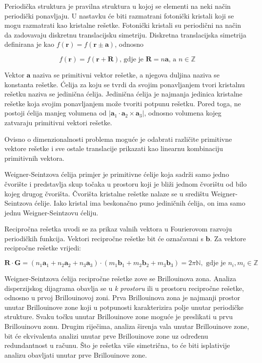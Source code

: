 \documentclass[utf8, seminar]{fer}
\begin{document}
Periodička struktura je pravilna struktura u kojoj se elementi na neki način
periodički ponavljaju. U nastavku će biti razmatrani fotonički kristali koji se
mogu razmatrati kao kristalne rešetke. Fotonički kristali su periodični na način
da zadovavaju diskretnu translacijsku simetriju.
Diskretna translacijska simetrija definirana je kao
${f(\mathbf{r}) = f(\mathbf{r} \pm \mathbf{a})}$, odnosno

\begin{equation}
	f(\mathbf{r}) = f(\mathbf{r} + \mathbf{R}) \text{, gdje je }{\mathbf{R} =
	n\mathbf{a}} \text{, a } n \in \mathbb{Z}
\end{equation}

Vektor $\mathbf{a}$ naziva se primitivni vektor rešetke, a njegova duljina
naziva se konstanta rešetke. Ćelija za koju se tvrdi da svojim ponavljanjem
tvori kristalnu rešetku naziva se jedinična ćelija. Jedinična ćelija je
najmanja jedinica kristalne rešetke koja svojim ponavljanjem može tvoriti
potpunu rešetku. Pored toga, ne postoji ćelija manjeg volumena od
${|\mathbf{a}_1 \cdot \mathbf{a}_2 \times \mathbf{a}_3|}$, odnosno volumena
kojeg zatvaraju primitivni vektori rešetke.


Ovisno o dimenzionalnosti problema moguće je odabrati različite primitivne
vektore rešetke i sve ostale translacije prikazati kao linearnu kombinaciju
primitivnih vektora.

Weigner-Seintzova ćelija primjer je primitivne ćelije koja sadrži samo jedno
čvorište i predstavlja skup točaka u prostoru koji je bliži jednom čvorištu
od bilo kojeg drugog čvorišta. Čvorišta kristalne rešetke nalaze se u središtu
Weigner-Seintzova ćelije. Iako kristal ima beskonačno puno jediničnih ćelija,
on ima samo jednu Weigner-Seintzovu ćeliju.

Recipročna rešetka uvodi se za prikaz valnih vektora u Fourierovom razvoju
periodičkih funkcija. Vektori recipročne rešetke bit će označavani s $\mathbf{b}$.
Za vektore recipročne rešetke vrijedi:

\begin{equation}
	\mathbf{R} \cdot \mathbf{G} =
	(n_1\mathbf{a}_1 + n_2\mathbf{a}_2 + n_3\mathbf{a}_3)
	\cdot
	(m_1\mathbf{b}_1 + m_2\mathbf{b}_2 + m_3\mathbf{b}_3) = 2 \pi \mathbb{N},
		\text{ gdje je }n_i, m_i \in \mathbb{Z}
\end{equation}


Weigner-Seintzova ćelija recipročne rešetke zove se Brillouinova zona. Analiza
disperzijskog dijagrama obavlja se u \textit{k prostoru} ili u prostoru
recipročne rešetke, odnosno u prvoj Brillouinovoj zoni. Prva Brillouinova zona je
najmanji prostor unutar Brillouinove zone koji u potpunosti karakterizira polje
unutar periodičke strukture. Svaku točku unutar Brillouinove zone moguće je
preslikati u prvu Brillouinovu zonu. Drugim riječima, analiza širenja vala unutar
Brillouinove zone, bit će ekvivalenta analizi unutar prve Brillouinove zone uz
određenu redundantnost u računu. Što je rešetka više simetrična, to će biti
isplativije analizu obavljati unutar prve Brillouinove zone.
\end{document}
